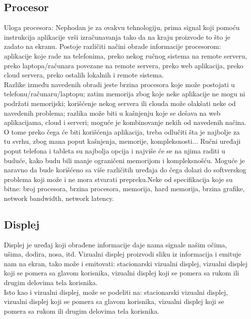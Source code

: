 \documentclass[a4paper]{article}
\begin{document}
	\subsection{Procesor}
    \label{sec:Procesor}
    Uloga procesora: Nephodan je za ovakvu tehnologiju, prima signal koji pomoću instrukcija aplikacije vrši izračunavanja tako da na kraju proizvode to što je zadato na ekranu. Postoje različiti načini obrade informacije procesorom: aplikacije koje rade na telefonima, preko nekog ručnog sistema na remote serveru, preko laptopa/računara povezane na remote servera, preko web aplikacija, preko cloud servera, preko ostalih lokalnih i remote sistema.\\
	Razlike između navedenih obradi jeste brzina procesora koje može postojati u telefonu/računaru/laptopu; zatim memorija zbog koje neke aplikacije ne mogu ni podržati memorijski; korišćenje nekog servera ili clouda može olakšati neke od navedenih problema; razlika može biti u kašnjenju koje se dešava na web aplikacijama, cloud i serveri; moguće je kombinovanje nekih od navedenih načina. \\
	O tome preko čega će biti korišćenja aplikacija, treba odlučiti šta je najbolje za tu svrhu, zbog mana poput kašnjenja, memorije, kompleksnosti... Ručni uređaji poput telefona i tableta su najbolja opcija i najviše će se na njima raditi u buduće, kako budu bili manje ograničeni memorijom i kompleksnošću. Moguće je naravno da bude korišćeno sa više različitih uređaja do čega dolazi do softverskog problema koji može i ne mora stvarati prepreku.Neke od specifikacija koje su bitne: broj procesora, brzina procesora, memorija, hard memorija, brzina grafike, network bandwidth, network latency.\\
	\subsection{Displej}
    \label{sec:Displej}
	Displej je uređaj koji obrađene informacije daje nama signale našim očima, ušima, dodira, nosa, itd. Vizualni displej proizvodi sliku iz informacija i emituje nam na ekran, tako može i emitovati:  stacionarski vizualni displej, vizualni displej koji se pomera sa glavom korisnika, vizualni displej koji se pomera sa rukom ili drugim delovima tela korisnika.\\
	Isto kao i vizualni displej, može se podeliti na: stacionarski vizualni displej, vizualni displej koji se pomera sa glavom korisnika, vizualni displej koji se pomera sa rukom ili drugim delovima tela korisnika. \\
	
\end{document}
